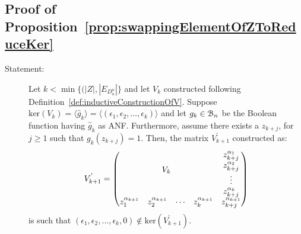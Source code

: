 \documentclass[11pt]{llncs}
\begin{document}
\subsection{Proof of Proposition~\ref{prop:swappingElementOfZToReduceKer}}
\begin{description}
    \item[Statement:] Let $k < \min\{(|Z|, |E_{D_n^n}|\}$ and let $V_k$ constructed following Definition~\ref{def:inductiveConstructionOfV}. 
    Suppose $\text{ker}(V_k) = \langle \hat{g}_k \rangle=\langle (\epsilon_1, \epsilon_2, \dots, \epsilon_k) \rangle $ and let $g_k\in \mathcal{B}_{n}$ be the Boolean function having $\hat{g}_k$ as ANF. 
    Furthermore, assume there exists a $z_{k+j}$, for $j\geq 1$ such that $g_k(z_{k+j}) = 1$. Then, the matrix $V^{'}_{k+1}$ constructed as:
    \begin{align*}
        V^{'}_{k+1} = 
        \begin{pmatrix}
        \multicolumn{4}{c}{\multirow{4}{*}{$V_{k}$}} & z_{k+j}^{\alpha_{1}}\\
        & & & & z_{k+j}^{\alpha_{2}}\\
        & & & & \vdots\\
        & & & & z_{k+j}^{\alpha_{k}}\\
        z_{1}^{\alpha_{k+1}} & z_{2}^{\alpha_{k+1}}& \cdots & z_{k}^{\alpha_{k+1}} & z_{k+j}^{\alpha_{k+1}}
    \end{pmatrix}
    \end{align*}
    is such that $(\epsilon_1, \epsilon_2, \dots, \epsilon_k, 0) \not\in \text{ker}(V^{'}_{k+1})$. 
\end{description}
\end{document}
